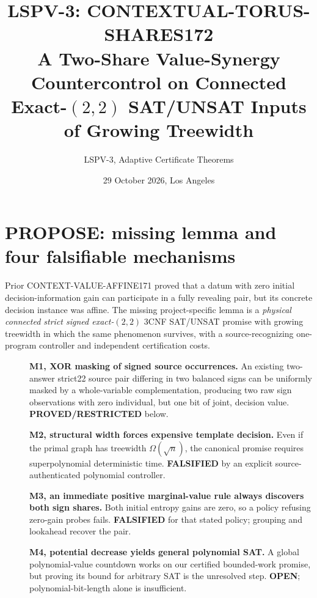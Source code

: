 \documentclass[11pt]{article}
\title{LSPV-3: CONTEXTUAL-TORUS-SHARES172\\\large A Two-Share Value-Synergy Countercontrol on Connected Exact-$(2,2)$ SAT/UNSAT Inputs of Growing Treewidth}
\author{LSPV-3, Adaptive Certificate Theorems}
\date{29 October 2026, Los Angeles}
\begin{document}
\maketitle
\begin{center}\end{center}

\section{PROPOSE: missing lemma and four falsifiable mechanisms}
Prior CONTEXT-VALUE-AFFINE171 proved that a datum with zero initial decision-information gain can participate in a fully revealing pair, but its concrete decision instance was affine. The missing project-specific lemma is a \emph{physical connected strict signed exact-$(2,2)$} 3CNF SAT/UNSAT promise with growing treewidth in which the same phenomenon survives, with a source-recognizing one-program controller and independent certification costs.
\begin{description}
\item[] \textbf{M1, XOR masking of signed source occurrences.} An existing two-answer strict22 source pair differing in two balanced signs can be uniformly masked by a whole-variable complementation, producing two raw sign observations with zero individual, but one bit of joint, decision value. \textbf{PROVED/RESTRICTED} below.
\item[] \textbf{M2, structural width forces expensive template decision.} Even if the primal graph has treewidth $\Omega(\sqrt n)$, the canonical promise requires superpolynomial deterministic time. \textbf{FALSIFIED} by an explicit source-authenticated polynomial controller.
\item[] \textbf{M3, an immediate positive marginal-value rule always discovers both sign shares.} Both initial entropy gains are zero, so a policy refusing zero-gain probes fails. \textbf{FALSIFIED} for that stated policy; grouping and lookahead recover the pair.
\item[] \textbf{M4, potential decrease yields general polynomial SAT.} A global polynomial-value countdown works on our certified bounded-work promise, but proving its bound for arbitrary SAT is the unresolved step. \textbf{OPEN}; polynomial-bit-length alone is insufficient.
\end{description}
\end{document}
